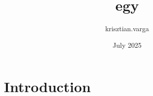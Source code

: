 \documentclass{article}
\title{egy}
\author{krisztian.varga }
\date{July 2025}
\begin{document}
\maketitle

\section{Introduction}
\end{document}
